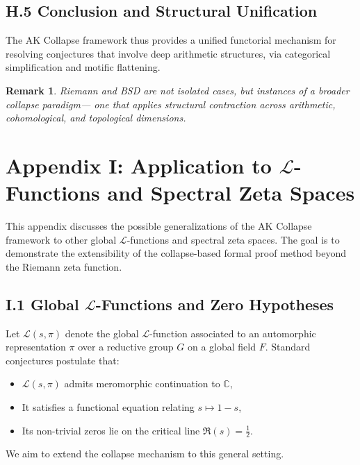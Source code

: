 \documentclass[11pt]{article}
\newtheorem{remark}[theorem]{Remark}
\begin{document}
\subsection*{H.5 Conclusion and Structural Unification}

The AK Collapse framework thus provides a unified functorial mechanism for resolving conjectures that involve deep arithmetic structures,  
via categorical simplification and motific flattening.

\begin{remark}
Riemann and BSD are not isolated cases, but instances of a broader collapse paradigm—  
one that applies structural contraction across arithmetic, cohomological, and topological dimensions.
\end{remark}



\section*{Appendix I: Application to $\mathcal{L}$-Functions and Spectral Zeta Spaces}

This appendix discusses the possible generalizations of the AK Collapse framework to other global $\mathcal{L}$-functions and spectral zeta spaces.  
The goal is to demonstrate the extensibility of the collapse-based formal proof method beyond the Riemann zeta function.

\subsection*{I.1 Global $\mathcal{L}$-Functions and Zero Hypotheses}

Let $\mathcal{L}(s, \pi)$ denote the global $\mathcal{L}$-function associated to an automorphic representation $\pi$ over a reductive group $G$  
on a global field $F$. Standard conjectures postulate that:

\begin{itemize}
    \item $\mathcal{L}(s, \pi)$ admits meromorphic continuation to $\mathbb{C}$,
    \item It satisfies a functional equation relating $s \mapsto 1-s$,
    \item Its non-trivial zeros lie on the critical line $\Re(s) = \tfrac{1}{2}$.
\end{itemize}

We aim to extend the collapse mechanism to this general setting.
\end{document}

